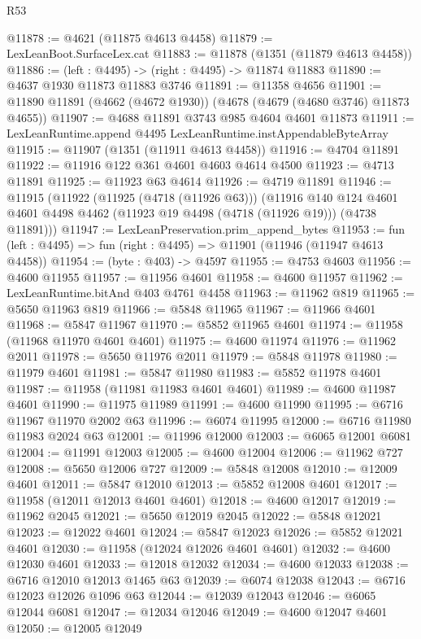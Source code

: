 \begin{lexlean}{R53}
\begin{coremodule}
@11878 := @4621 (@11875 @4613 @4458)
@11879 := LexLeanBoot.SurfaceLex.cat
@11883 := @11878 (@1351 (@11879 @4613 @4458))
@11886 := (left : @4495) -> (right : @4495) -> @11874 @11883
@11890 := @4637 @1930 @11873 @11883 @3746
@11891 := @11358 @4656
@11901 := @11890 @11891 (@4662 (@4672 @1930)) (@4678 (@4679 (@4680 @3746) @11873 @4655))
@11907 := @4688 @11891 @3743 @985 @4604 @4601 @11873
@11911 := LexLeanRuntime.append @4495 LexLeanRuntime.instAppendableByteArray
@11915 := @11907 (@1351 (@11911 @4613 @4458))
@11916 := @4704 @11891
@11922 := @11916 @122 @361 @4601 @4603 @4614 @4500
@11923 := @4713 @11891
@11925 := @11923 @63 @4614
@11926 := @4719 @11891
@11946 := @11915
    (@11922
      (@11925 (@4718 (@11926 @63)))
      (@11916
        @140
        @124
        @4601
        @4601
        @4498
        @4462
        (@11923 @19 @4498 (@4718 (@11926 @19)))
        (@4738 @11891)))
@11947 := LexLeanPreservation.prim_append_bytes
@11953 := fun (left : @4495) => fun (right : @4495) => @11901 (@11946 (@11947 @4613 @4458))
@11954 := (byte : @403) -> @4597
@11955 := @4753 @4603
@11956 := @4600 @11955
@11957 := @11956 @4601
@11958 := @4600 @11957
@11962 := LexLeanRuntime.bitAnd @403 @4761 @4458
@11963 := @11962 @819
@11965 := @5650 @11963 @819
@11966 := @5848 @11965
@11967 := @11966 @4601
@11968 := @5847 @11967
@11970 := @5852 @11965 @4601
@11974 := @11958 (@11968 @11970 @4601 @4601)
@11975 := @4600 @11974
@11976 := @11962 @2011
@11978 := @5650 @11976 @2011
@11979 := @5848 @11978
@11980 := @11979 @4601
@11981 := @5847 @11980
@11983 := @5852 @11978 @4601
@11987 := @11958 (@11981 @11983 @4601 @4601)
@11989 := @4600 @11987 @4601
@11990 := @11975 @11989
@11991 := @4600 @11990
@11995 := @6716 @11967 @11970 @2002 @63
@11996 := @6074 @11995
@12000 := @6716 @11980 @11983 @2024 @63
@12001 := @11996 @12000
@12003 := @6065 @12001 @6081
@12004 := @11991 @12003
@12005 := @4600 @12004
@12006 := @11962 @727
@12008 := @5650 @12006 @727
@12009 := @5848 @12008
@12010 := @12009 @4601
@12011 := @5847 @12010
@12013 := @5852 @12008 @4601
@12017 := @11958 (@12011 @12013 @4601 @4601)
@12018 := @4600 @12017
@12019 := @11962 @2045
@12021 := @5650 @12019 @2045
@12022 := @5848 @12021
@12023 := @12022 @4601
@12024 := @5847 @12023
@12026 := @5852 @12021 @4601
@12030 := @11958 (@12024 @12026 @4601 @4601)
@12032 := @4600 @12030 @4601
@12033 := @12018 @12032
@12034 := @4600 @12033
@12038 := @6716 @12010 @12013 @1465 @63
@12039 := @6074 @12038
@12043 := @6716 @12023 @12026 @1096 @63
@12044 := @12039 @12043
@12046 := @6065 @12044 @6081
@12047 := @12034 @12046
@12049 := @4600 @12047 @4601
@12050 := @12005 @12049

\end{coremodule}
\end{lexlean}
